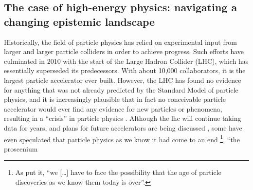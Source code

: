 \documentclass{article}
\begin{document}



\subsection{\label{sec:hep}The case of high-energy physics: navigating a changing epistemic landscape}

Historically, the field of particle physics has relied on experimental input from larger and larger particle colliders in order to achieve progress. Such efforts have culminated in 2010 with the start of the Large Hadron Collider (LHC), which has essentially superseded its predecessors. With about  10,000 collaborators, it is the largest particle accelerator ever built. However, the LHC has found no evidence for anything that was not already predicted by the Standard Model of particle physics, and it is increasingly plausible that in fact no conceivable particle accelerator would ever find any evidence for new particles or phenomena, resulting in a ``crisis'' in particle physics \citep{susy_crisis}. Although the \gls{lhc} will continue taking data for years, and plans for future accelerators are being discussed \citep{Roser2023}, some have even speculated that particle physics as we know it had come to an end \citep{Harlander2023,Kosyakov2023}\footnote{As \citet{Harlander2023} put it, ``we [\dots] have to face the possibility that the age of particle discoveries as we know them today is over''.}, ``the proscenium
\end{document}
